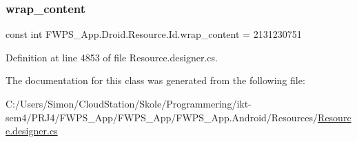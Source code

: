 \mbox{\label{class_f_w_p_s___app_1_1_droid_1_1_resource_1_1_id_aa631c106661ca56ff0ecb0ecaca9d226}} 
\subsubsection{\texorpdfstring{wrap\+\_\+content}{wrap\_content}}
{\footnotesize\ttfamily const int F\+W\+P\+S\+\_\+\+App.\+Droid.\+Resource.\+Id.\+wrap\+\_\+content = 2131230751}



Definition at line 4853 of file Resource.\+designer.\+cs.



The documentation for this class was generated from the following file\+:\begin{DoxyCompactItemize}
\item 
C\+:/\+Users/\+Simon/\+Cloud\+Station/\+Skole/\+Programmering/ikt-\/sem4/\+P\+R\+J4/\+F\+W\+P\+S\+\_\+\+App/\+F\+W\+P\+S\+\_\+\+App/\+F\+W\+P\+S\+\_\+\+App.\+Android/\+Resources/\mbox{\hyperlink{_resource_8designer_8cs}{Resource.\+designer.\+cs}}\end{DoxyCompactItemize}
